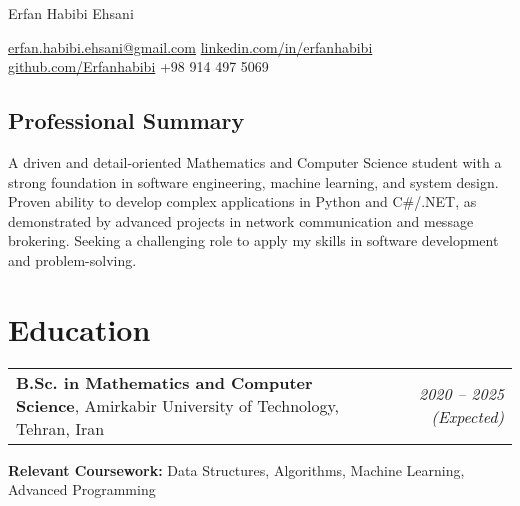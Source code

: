 \documentclass[10pt,a4paper]{article}
\newenvironment{header}{\centering}{\par}
\newenvironment{onecolentry}{\begin{adjustwidth}{0pt}{0pt}}{\end{adjustwidth}}
\begin{document}
\begin{header}
    \fontsize{25pt}{25pt}\selectfont Erfan Habibi Ehsani 

    \vspace{4pt}

    \normalsize
    \href{mailto:erfan.habibi.ehsani@gmail.com}{erfan.habibi.ehsani@gmail.com} 
    \kern 5.0pt\textbar\kern 5.0pt
    \href{https://www.linkedin.com/in/erfanhabibi/}{linkedin.com/in/erfanhabibi} 
    \kern 5.0pt\textbar\kern 5.0pt
    \href{https://github.com/Erfanhabibi}{github.com/Erfanhabibi} 
    \kern 5.0pt\textbar\kern 5.0pt
    +98 914 497 5069 
\end{header}

\begin{onecolentry}
\vspace{4pt}
\section{Professional Summary}
A driven and detail-oriented Mathematics and Computer Science student with a strong foundation in software engineering, machine learning, and system design. Proven ability to develop complex applications in Python and C\#/.NET, as demonstrated by advanced projects in network communication and message brokering. Seeking a challenging role to apply my skills in software development and problem-solving.
\end{onecolentry}


\section{Education}
\begin{tabularx}{\textwidth}{Xr}
    \textbf{B.Sc. in Mathematics and Computer Science}, Amirkabir University of Technology, Tehran, Iran  & \textit{2020 -- 2025 (Expected)} \\
\end{tabularx}
\textbf{Relevant Coursework:} Data Structures, Algorithms, Machine Learning, Advanced Programming 


\end{document}
